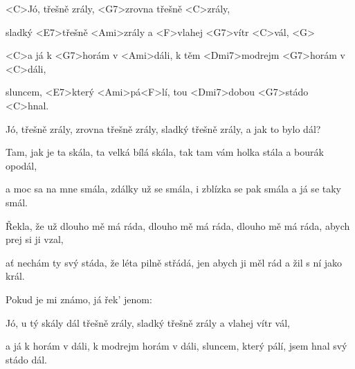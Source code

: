 

\zs
<C>Jó, třešně zrály, <G7>zrovna třešně <C>zrály,

sladký <E7>třešně <Ami>zrály a <F>vlahej <G7>vítr <C>vál, <G>

<C>a já k <G7>horám v <Ami>dáli, k těm <Dmi7>modrejm <G7>horám v <C>dáli,

sluncem, <E7>který <Ami>pá<F>lí, tou <Dmi7>dobou <G7>stádo <C>hnal.
\ks

\zr
Jó, třešně zrály, zrovna třešně zrály, sladký třešně zrály, a jak to bylo dál?
\kr

\zs
Tam, jak je ta skála, ta velká bílá skála, tak tam vám holka stála a bourák opodál,

a moc sa na mne smála, zdálky už se smála, i zblízka se pak smála a já se taky smál.
\ks

\zr\kr

\zs
Řekla, že už dlouho mě má ráda, dlouho mě má ráda, dlouho mě má ráda, abych prej si ji vzal,

ať nechám ty svý stáda, že léta pilně střádá, jen abych ji měl rád a žil s ní jako král.
\ks

\zr\kr

\zs
Pokud je mi známo, já řek' jenom: 
\ks

\zr\kr

\zs
Jó, u tý skály dál třešně zrály, sladký třešně zrály a vlahej vítr vál,

a já k horám v dáli, k modrejm horám v dáli, sluncem, který pálí, jsem hnal svý stádo dál.
\ks

\kp
